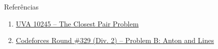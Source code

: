 \begin{frame}[fragile]{Referências}

    \begin{enumerate}
        \item \href{https://uva.onlinejudge.org/index.php?option=com_onlinejudge&Itemid=8&category=24&page=show_problem&problem=1186}{UVA 10245 -- The Closest Pair Problem}

        \item \href{https://codeforces.com/problemset/problem/593/B}{Codeforces Round \#329 (Div. 2) -- Problem B: Anton and Lines}




    \end{enumerate}

\end{frame}
